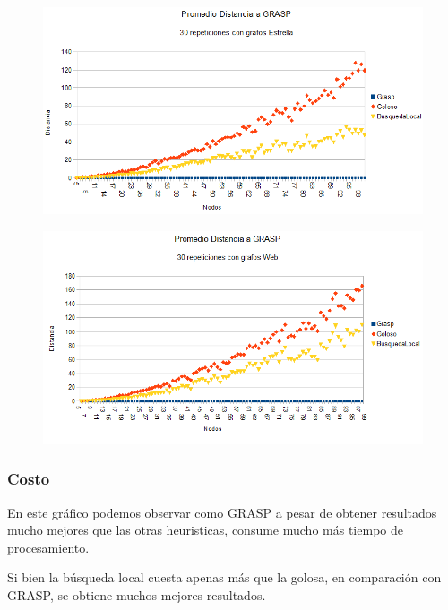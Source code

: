 \begin{figure}[H]
	\centering
	\includegraphics[scale=0.8]{distancia-Grasp-Star.png}
\end{figure}

\begin{figure}[H]
	\centering
	\includegraphics[scale=0.8]{distancia-Grasp-Web.png}
\end{figure}

\subsubsection{Costo}


\quad En este gráfico podemos observar como GRASP a pesar de obtener resultados mucho mejores que las otras heuristicas, consume mucho más tiempo de procesamiento.

\quad Si bien la búsqueda local cuesta apenas más que la golosa, en comparación con GRASP, se obtiene muchos mejores resultados.
